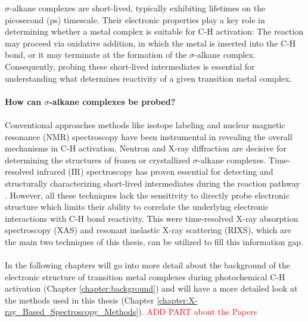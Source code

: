 \noindent
$\sigma$-alkane complexes are short-lived, typically exhibiting lifetimes on the picosecond (ps) timescale. Their electronic properties play a key role in determining whether a metal complex is suitable for C-H activation: The reaction may proceed via oxidative addition, in which the metal is inserted into the C-H bond, or it may terminate at the formation of the $\sigma$-alkane complex. Consequently, probing these short-lived intermediates is essential for understanding what determines reactivity of a given transition metal complex. 
\\ \\ \textbf{How can $\sigma$-alkane complexes be probed?} \\ \\
Conventional approaches methods like isotope labeling \cite{jones2003isotope} and nuclear magnetic resonance (NMR) spectroscopy \cite{ball2007delicate, bernskoetter2009characterization, watson2022binding} have been instrumental in revealing the overall mechanisms in C-H activation. Neutron and X-ray diffraction \cite{pike2015solid, chadwick2016selective, evans1997heptane, gyton2025operationally} are decisive for determining the structures of frozen or crystallized $\sigma$-alkane complexes. Time-resolved infrared (IR) spectroscopy has proven essential for detecting and structurally characterizing short-lived intermediates during the reaction pathway \cite{bromberg1997mechanism, lian1996femtosecond, bengali1994activation, schultz1994ir, fairlamb2024unveiling}. However, all these techniques lack the sensitivity to directly probe electronic structure which limits their ability to correlate the underlying electronic interactions with C-H bond reactivity. This were time-resolved X-ray absorption spectroscopy (XAS) and resonant inelastic X-ray scattering (RIXS), which are the main two techniques of this thesis, can be utilized to fill this information gap.\\ \\
In the following chapters will go into more detail about the background of the electronic structure of transition metal complexes during photochemical C-H activation (Chapter \ref{chapter:background}) and will have a more detailed look at the methods used in this thesis (Chapter \ref{chapter:X-ray_Based_Spectroscopy_Methods}). \textcolor{red}{ADD PART about the Papers}

